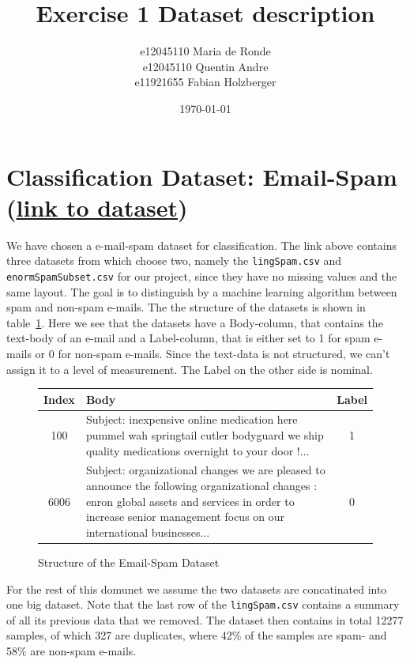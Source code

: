 \documentclass[11pt]{article}
\title{Exercise 1 Dataset description}
\author{e12045110 Maria de Ronde \\ e12045110  Quentin Andre  \\ e11921655 Fabian Holzberger}
\date{\today}
\begin{document}
\graphicspath{{./figures/}}
\maketitle

\newpage
%
\section{Classification Dataset: Email-Spam (\href{https://www.kaggle.com/nitishabharathi/email-spam-dataset?select=enronSpamSubset.csv}{link to dataset})}
We have chosen a e-mail-spam dataset for classification. The link above contains three datasets from which choose two, namely the \texttt{lingSpam.csv} and \texttt{enormSpamSubset.csv} for our project, since they have no missing values and the same layout.  The goal is to distinguish by a machine learning algorithm between spam and non-spam e-mails. The the structure of the datasets is shown in table~\ref{tab::0}. Here we see that the datasets have a Body-column, that contains the text-body of an e-mail and a Label-column, that is either set to 1 for spam e-mails or 0 for non-spam e-mails. Since the text-data is not structured, we can't assign it to a level of measurement. The Label on the other side is nominal.   
%
\begin{figure}[h]
  \begin{tabular}{ | c | p{15cm} | c |}
    \hline
    Index & Body & Label \\
    \hline
    100 & 
    Subject: inexpensive online medication here
 pummel wah springtail cutler bodyguard
 we ship quality medications overnight to your door !...
    & 1 \\ \hline
    6006
    &
    Subject: organizational changes
 we are pleased to announce the following organizational changes :
 enron global assets and services
 in order to increase senior management focus on our international businesses... 
    & 0 \\
    \hline
    \end{tabular}
    \caption{Structure of the Email-Spam Dataset}
    \label{tab::0}
  \end{figure}
%
For the rest of this domunet we assume the two datasets are concatinated into one big dataset. Note that the last row of the \texttt{lingSpam.csv} contains a summary of all its previous data that we removed. The dataset then contains in total 12277 samples, of which 327 are duplicates, where 42\% of the samples are spam- and 58\% are non-spam e-mails. %
\end{document}
